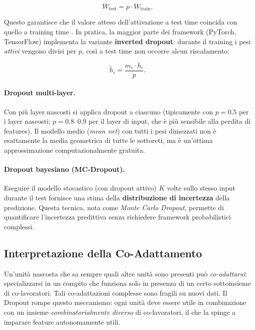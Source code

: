 \begin{equation}
  W_{\text{test}} = p \cdot W_{\text{train}}.
  \label{eq:weight-scaling}
\end{equation}

Questo garantisce che il valore atteso dell'attivazione a test time coincida
con quello a training time \citep{srivastava2014dropout}. In pratica, la
maggior parte dei framework (PyTorch, TensorFlow) implementa la variante
\textbf{inverted dropout}: durante il training i pesi \emph{attivi} vengono
divisi per $p$, così a test time non occorre alcun riscalamento:

\begin{equation}
  \tilde{h}_i = \frac{m_i \cdot h_i}{p}.
  \label{eq:inverted-dropout}
\end{equation}

\paragraph{Dropout multi-layer.}
Con più layer nascosti si applica dropout a ciascuno (tipicamente con $p = 0.5$
per i layer nascosti; $p = 0.8$--$0.9$ per il layer di input, che è più
sensibile alla perdita di features). Il modello medio (\emph{mean net}) con
tutti i pesi dimezzati non è esattamente la media geometrica di tutte le
sottoreti, ma è un'ottima approssimazione computazionalmente gratuita.

\paragraph{Dropout bayesiano (MC-Dropout).}
Eseguire il modello stocastico (con dropout attivo) $K$ volte sullo stesso
input durante il test fornisce una stima della \textbf{distribuzione di
incertezza} della predizione. Questa tecnica, nota come \emph{Monte Carlo
Dropout}, permette di quantificare l'incertezza predittiva senza richiedere
framework probabilistici complessi.

\subsection{Interpretazione della Co-Adattamento}
\label{subsec:coadaptation}

Un'unità nascosta che sa sempre quali altre unità sono presenti può
\emph{co-adattarsi}: specializzarsi in un compito che funziona solo in presenza
di un certo sottoinsieme di co-lavoratori. Tali co-adattazioni complesse sono
fragili su nuovi dati. Il Dropout rompe questo meccanismo: ogni unità deve
essere utile in combinazione con un insieme \emph{combinatorialmente diverso}
di co-lavoratori, il che la spinge a imparare feature autonomamente utili.

